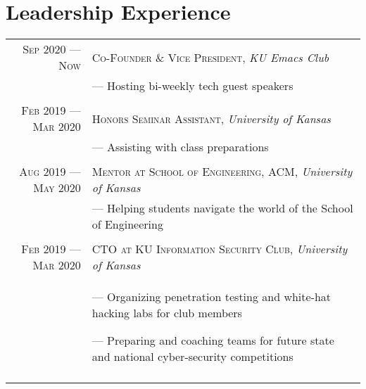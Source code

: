 \documentclass[a4paper,10pt]{article}
\begin{document}
\section{Leadership Experience}
\begin{tabular}{r|p{11cm}}

	\textsc{Sep 2020 --- Now} & \textsc{Co-Founder \& Vice President}, \emph{KU Emacs Club} \\&\footnotesize{
		--- Hosting bi-weekly tech guest speakers
	}                                                                                                                                                   \\\multicolumn{2}{c}{}\\

	\textsc{Feb 2019 --- Mar 2020} & \textsc{Honors Seminar Assistant}, \emph{University of Kansas}                                                     \\&\footnotesize{
		--- Assisting with class preparations
	}                                                                                                                                                   \\\multicolumn{2}{c}{}\\

	\textsc{Aug 2019 --- May 2020} & \textsc{Mentor at School of Engineering, ACM}, \emph{University of Kansas}                                         \\&\footnotesize{
		--- Helping students navigate the world of the School of Engineering

	}                                                                                                                                                   \\\multicolumn{2}{c}{}\\

	\textsc{Feb 2019 --- Mar 2020} & \textsc{CTO at KU Information Security Club}, \emph{University of Kansas}                                          \\&\footnotesize{
		--- Organizing penetration testing and white-hat hacking labs for club members


		--- Preparing and coaching teams for future state and national cyber-security competitions
	}                                                                                                                                                   \\\multicolumn{2}{c}{}\\


\end{tabular}
\end{document}
